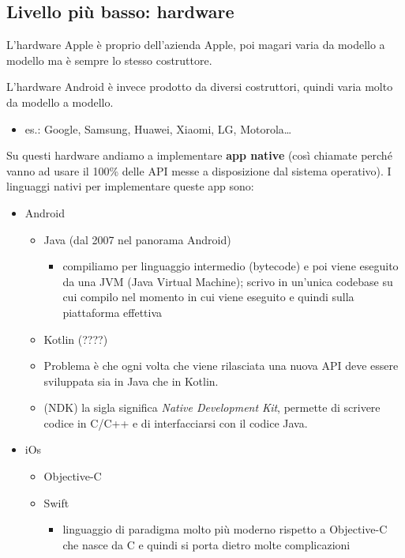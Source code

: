 \subsection{Livello più basso: hardware}
\par L'hardware Apple è proprio dell'azienda Apple, poi magari varia da modello a modello ma è sempre lo stesso costruttore.
\par L'hardware Android è invece prodotto da diversi costruttori, quindi varia molto da modello a modello.
\begin{itemize}
    \item es.: Google, Samsung, Huawei, Xiaomi, LG, Motorola\dots
\end{itemize}
\par Su questi hardware andiamo a implementare \textbf{app native} (così chiamate perché vanno ad usare il 100\% delle API messe a disposizione dal sistema operativo). I linguaggi nativi per implementare queste app sono:
\begin{itemize}
    \item Android
    \begin{itemize}
        \item Java (dal 2007 nel panorama Android)
        \begin{itemize}
            \item compiliamo per linguaggio intermedio (bytecode) e poi viene eseguito da una JVM (Java Virtual Machine); scrivo in un'unica codebase su cui compilo nel momento in cui viene eseguito e quindi sulla piattaforma effettiva
        \end{itemize}
        \item Kotlin (????)
        \item Problema è che ogni volta che viene rilasciata una nuova API deve essere sviluppata sia in Java che in Kotlin.
        \item (NDK) la sigla significa \textit{Native Development Kit}, permette di scrivere codice in C/C++ e di interfacciarsi con il codice Java.
    \end{itemize}
    \item iOs
    \begin{itemize}
        \item Objective-C 
        \item Swift
        \begin{itemize}
            \item linguaggio di paradigma molto più moderno rispetto a Objective-C che nasce da C e quindi si porta dietro molte complicazioni
        \end{itemize}
    \end{itemize}
\end{itemize}

